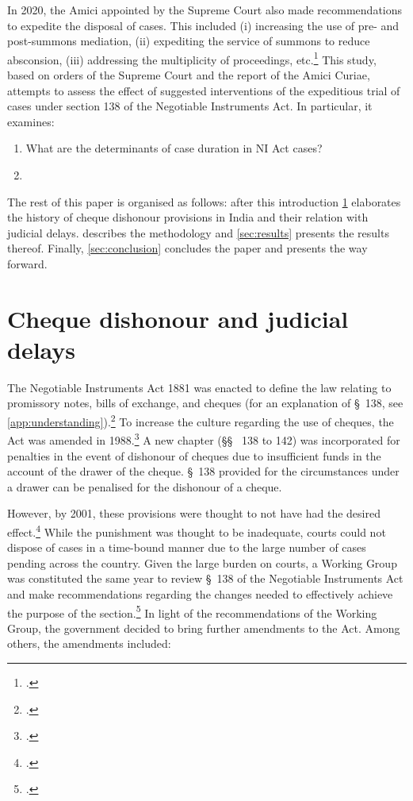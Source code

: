 In 2020, the Amici appointed by the Supreme Court also made recommendations to expedite the disposal of cases. This included (i) increasing the use of pre- and post-summons mediation, (ii) expediting the service of summons to reduce absconsion, (iii) addressing the multiplicity of proceedings, etc.\footcite{amicus2020_submission} This study, based on orders of the Supreme Court and the report of the Amici Curiae, attempts to assess the effect of suggested interventions of the expeditious trial of cases under section 138 of the Negotiable Instruments Act. In particular, it examines:

\begin{enumerate}
 \item What are the determinants of case duration in NI Act cases?
 \item 
\end{enumerate}

The rest of this paper is organised as follows: after this introduction \cref{sec:history} elaborates the history of cheque dishonour provisions in India and their relation with judicial delays.  describes the methodology and \cref{sec:results} presents the results thereof. Finally, \cref{sec:conclusion} concludes the paper and presents the way forward.

\section{Cheque dishonour and judicial delays}
\label{sec:history}

The Negotiable Instruments Act 1881 was enacted to define the law relating to promissory notes, bills of exchange, and cheques (for an explanation of \S~138, see \cref{app:understanding}).\footcite{ind1881_niAct} To increase the culture regarding the use of cheques, the Act was amended in 1988.\footcite{niAmend1988} A new chapter (\S\S~ 138 to 142) was incorporated for penalties in the event of dishonour of cheques due to insufficient funds in the account of the drawer of the cheque. \S~138 provided for the circumstances under a drawer can be penalised for the dishonour of a cheque.

However, by 2001, these provisions were thought to not have had the desired effect.\footcite{stdcomm2001_138niAct} While the punishment was thought to be inadequate, courts could not dispose of cases in a time-bound manner due to the large number of cases pending across the country. Given the large burden on courts, a Working Group was constituted the same year to review \S~138 of the Negotiable Instruments Act and make recommendations regarding the changes needed to effectively achieve the purpose of the section.\footcite{wg2001_138} In light of the recommendations of the Working Group, the government decided to bring further amendments to the Act. Among others, the amendments included:


